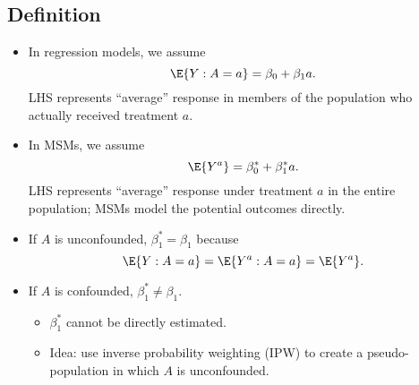 \documentclass[oneside]{book}\usepackage[]{graphicx}\usepackage[svgnames]{xcolor}
\providecommand\given{} %
\renewcommand\given{\nonscript\:\delimsize\vert\nonscript\:\mathopen{}}%
\renewcommand\given{\nonscript\:\delimsize\vert\nonscript\:\mathopen{}}%
\renewcommand\given{\nonscript\:\delimsize\vert\nonscript\:\mathopen{}}%
\renewcommand\given{\nonscript\:\delimsize\vert\nonscript\:\mathopen{}}%
\renewcommand\given{\nonscript\:\delimsize\vert\nonscript\:\mathopen{}}%
\renewcommand\given{\nonscript\:\delimsize\vert\nonscript\:\mathopen{}}%
\renewcommand\given{\nonscript\:\delimsize\vert\nonscript\:\mathopen{}}%
\renewcommand\given{\nonscript\:\delimsize\vert\nonscript\:\mathopen{}}%
\renewcommand\given{\nonscript\:\delimsize\vert\nonscript\:\mathopen{}}%
\renewcommand\given{\nonscript\:\delimsize\vert\nonscript\:\mathopen{}}%
\renewcommand\given{\nonscript\:\delimsize\vert\nonscript\:\mathopen{}}%
\renewcommand\given{\nonscript\:\delimsize\vert\nonscript\:\mathopen{}}%
\renewcommand\given{\nonscript\:\delimsize\vert\nonscript\:\mathopen{}}%
\renewcommand\given{\nonscript\:\delimsize\vert\nonscript\:\mathopen{}}%
\renewcommand\given{:}
\begin{document}
\subsection*{Definition}
\begin{itemize}
    \item In regression models, we assume
          \[ \E{Y\given A=a}=\beta_0+\beta_1a. \]
          LHS represents ``average'' response in members of the population who actually received treatment $ a $.
    \item In MSMs, we assume
          \[ \E{Y^a}=\beta_0^*+\beta_1^*a. \]
          LHS represents ``average'' response under treatment $a$ in the
          entire population; MSMs model the potential outcomes
          directly.
    \item If $ A $ is unconfounded, $ \beta_1^*=\beta_1 $ because
          \[ \E{Y\given A=a}=\E{Y^a\given A=a}=\E{Y^a}. \]
    \item If $ A $ is confounded, $ \beta_1^*\ne \beta_1 $.
          \begin{itemize}
              \item $\beta_1^*$ cannot be directly estimated.
              \item Idea: use inverse probability weighting (IPW) to create a
                    pseudo-population in which $A$ is unconfounded.
          \end{itemize}
\end{itemize}
\end{document}
